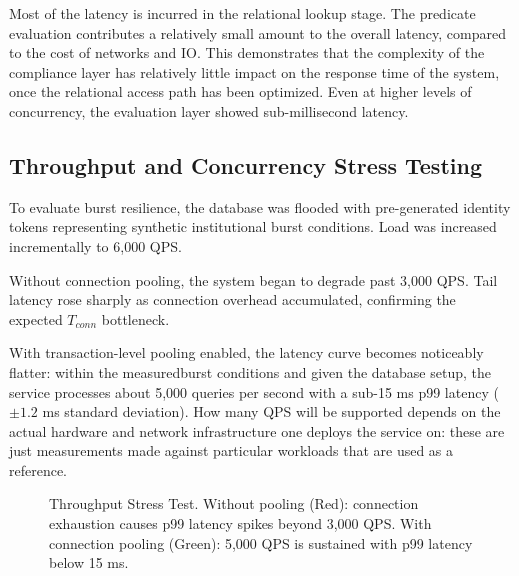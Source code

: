 \documentclass[conference]{IEEEtran}
\begin{document}
Most of the latency is incurred in the relational lookup stage. The predicate evaluation contributes a relatively small amount to the overall latency, compared to the cost of networks and IO. This demonstrates that the complexity of the compliance layer has relatively little impact on the response time of the system, once the relational access path has been optimized. Even at higher levels of concurrency, the evaluation layer showed sub-millisecond latency.

\subsection{Throughput and Concurrency Stress Testing}
To evaluate burst resilience, the database was flooded with pre-generated identity tokens representing synthetic institutional burst conditions. Load was increased incrementally to 6,000 QPS.

Without connection pooling, the system began to degrade past 3,000 QPS. Tail latency rose sharply as connection overhead accumulated, confirming the expected $T_{conn}$ bottleneck.

With transaction-level pooling enabled, the latency curve becomes noticeably flatter: within the measuredburst conditions and given the database setup, the service processes about 5,000 queries per second with a sub-15 ms p99 latency ($\pm 1.2$ ms standard deviation). How many QPS will be supported depends on the actual hardware and network infrastructure one deploys the service on: these are just measurements made against particular workloads that are used as a reference.

\begin{figure}[htbp]
\centering
{}
\caption{Throughput Stress Test. Without pooling (Red): connection exhaustion causes p99 latency spikes beyond 3,000 QPS. With connection pooling (Green): 5,000 QPS is sustained with p99 latency below 15 ms.}
\label{fig:throughput}
\end{figure}
\end{document}
